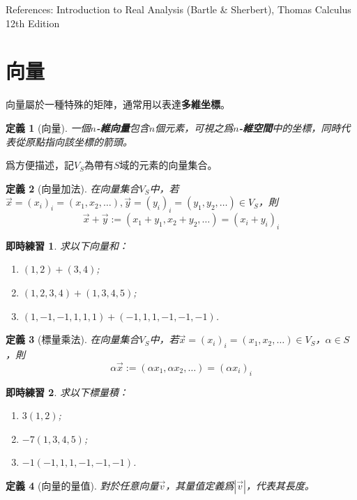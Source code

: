 \documentclass[12pt]{article}
\newtheorem{definition}{定義}
\newtheorem*{exercise}{即時練習}
\begin{document}
    References: Introduction to Real Analysis (Bartle \& Sherbert), Thomas Calculus 12th Edition
    \section*{向量}

    向量屬於一種特殊的矩陣，通常用以表達\textbf{多維坐標}。

    \begin{definition}[向量]
        一個\textbf{$n$-維向量}包含$n$個元素，可視之爲\textbf{$n$-維空間}中的坐標，同時代表從原點指向該坐標的箭頭。
    \end{definition}
    
    爲方便描述，記$V_S$為帶有$S$域的元素的向量集合。

    \begin{definition}[向量加法]
        在向量集合$V_S$中，若$\vec{x}=(x_i)_i=(x_1,x_2,\dots),\vec{y}=(y_i)_i=(y_1,y_2,\dots)\in V_S$，則$$\vec{x}+\vec{y}:=(x_1+y_1,x_2+y_2,\dots)=(x_i+y_i)_i$$
    \end{definition}

    \begin{exercise}
        求以下向量和：\begin{enumerate}
            \item $(1,2)+(3,4)$;
            \item $(1,2,3,4)+(1,3,4,5)$;
            \item $(1,-1,-1,1,1,1)+(-1,1,1,-1,-1,-1)$.
        \end{enumerate}
    \end{exercise}

    \begin{definition}[標量乘法]
        在向量集合$V_S$中，若$\vec{x}=(x_i)_i=(x_1,x_2,\dots)\in V_S$，$\alpha \in S$，則$$\alpha \vec{x}:=(\alpha x_1,\alpha x_2,\dots)=(\alpha x_i)_i$$
    \end{definition}

    \begin{exercise}
        求以下標量積：\begin{enumerate}
            \item $3(1,2)$;
            \item $-7(1,3,4,5)$;
            \item $-1(-1,1,1,-1,-1,-1)$.
        \end{enumerate}
    \end{exercise}

    \begin{definition}[向量的量值]
        對於任意向量$\vec{v}$，其量值定義爲$|\vec{v}|$，代表其長度。
    \end{definition}
\end{document}
